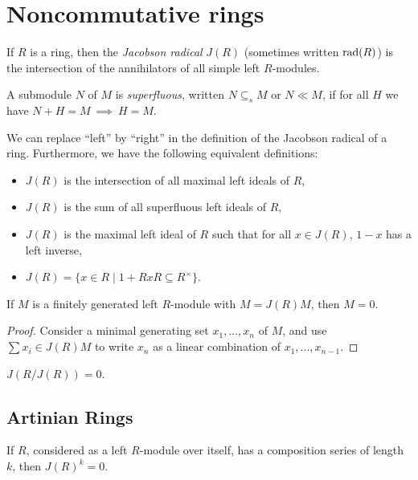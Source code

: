 \section{Noncommutative rings}

\begin{defn} If $R$ is a ring, then the \emph{Jacobson radical} $J(R)$ (sometimes written $\operatorname{rad}(R)$) is the intersection of the annihilators of all simple left $R$-modules.
\end{defn}

\begin{defn} A submodule $N$ of $M$ is \emph{superfluous}, written $N \subseteq_s M$ or $N \ll M$, if for all $H$ we have $N+H = M\ \implies\ H = M$.
\end{defn}

\begin{thm} We can replace ``left'' by ``right'' in the definition of the Jacobson radical of a ring. Furthermore, we have the following equivalent definitions:
\begin{itemize}
\item $J(R)$ is the intersection of all maximal left ideals of $R$,
\item $J(R)$ is the sum of all superfluous left ideals of $R$,
\item $J(R)$ is the maximal left ideal of $R$ such that for all $x \in J(R)$, $1-x$ has a left inverse,
\item $J(R) = \{x \in R \mid 1+RxR \subseteq R^\times\}$.
\end{itemize}
\end{thm}

\begin{lem} If $M$ is a finitely generated left $R$-module with $M = J(R)M$, then $M=0$.
\end{lem}
\begin{proof} Consider a minimal generating set $x_1, ..., x_n$ of $M$, and use $\sum x_i \in J(R)M$ to write $x_n$ as a linear combination of $x_1, ..., x_{n-1}$.
\end{proof}

\begin{prop} $J(R/J(R)) = 0$.
\end{prop}

\subsection{Artinian Rings}

\begin{prop} If $R$, considered as a left $R$-module over itself, has a composition series of length $k$, then $J(R)^k = 0$.
\end{prop}

